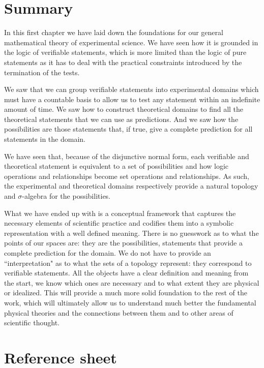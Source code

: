 \documentclass[11pt,letterpaper,fleqn]{memoir} %
\begin{document}
\section{Summary}

In this first chapter we have laid down the foundations for our general mathematical theory of experimental science. We have seen how it is grounded in the logic of verifiable statements, which is more limited than the logic of pure statements as it has to deal with the practical constraints introduced by the termination of the tests.

We saw that we can group verifiable statements into experimental domains which must have a countable basis to allow us to test any statement within an indefinite amount of time. We saw how to construct theoretical domains to find all the theoretical statements that we can use as predictions. And we saw how the possibilities are those statements that, if true, give a complete prediction for all statements in the domain.

We have seen that, because of the disjunctive normal form, each verifiable and theoretical statement is equivalent to a set of possibilities and how logic operations and relationships become set operations and relationships. As such, the experimental and theoretical domains respectively provide a natural topology and $\sigma$-algebra for the possibilities.

What we have ended up with is a conceptual framework that captures the necessary elements of scientific practice and codifies them into a symbolic representation with a well defined meaning. There is no guesswork as to what the points of our spaces are: they are the possibilities, statements that provide a complete prediction for the domain. We do not have to provide an ``interpretation" as to what the sets of a topology represent: they correspond to verifiable statements. All the objects have a clear definition and meaning from the start, we know which ones are necessary and to what extent they are physical or idealized. This will provide a much more solid foundation to the rest of the work, which will ultimately allow us to understand much better the fundamental physical theories and the connections between them and to other areas of scientific thought.

\newpage

\section{Reference sheet}
\end{document}
